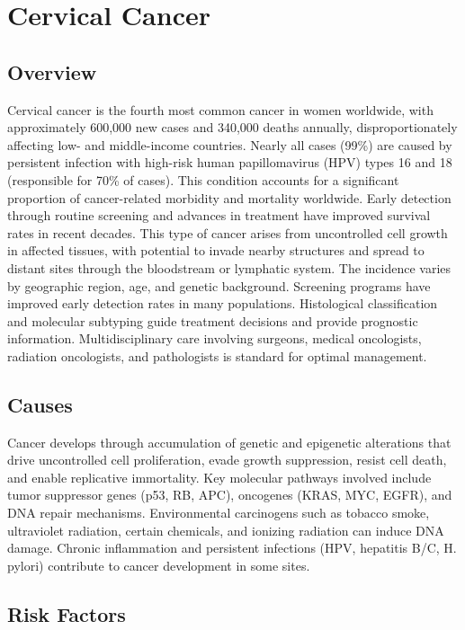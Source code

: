 \chapter{Cervical Cancer}
\label{sec:Cervical Cancer}

\section{Overview}
Cervical cancer is the fourth most common cancer in women worldwide, with approximately 600,000 new cases and 340,000 deaths annually, disproportionately affecting low- and middle-income countries. Nearly all cases (99\%) are caused by persistent infection with high-risk human papillomavirus (HPV) types 16 and 18 (responsible for 70\% of cases). This condition accounts for a significant proportion of cancer-related morbidity and mortality worldwide. Early detection through routine screening and advances in treatment have improved survival rates in recent decades. This type of cancer arises from uncontrolled cell growth in affected tissues, with potential to invade nearby structures and spread to distant sites through the bloodstream or lymphatic system. The incidence varies by geographic region, age, and genetic background. Screening programs have improved early detection rates in many populations. Histological classification and molecular subtyping guide treatment decisions and provide prognostic information. Multidisciplinary care involving surgeons, medical oncologists, radiation oncologists, and pathologists is standard for optimal management.
\section{Causes}
Cancer develops through accumulation of genetic and epigenetic alterations that drive uncontrolled cell proliferation, evade growth suppression, resist cell death, and enable replicative immortality. Key molecular pathways involved include tumor suppressor genes (p53, RB, APC), oncogenes (KRAS, MYC, EGFR), and DNA repair mechanisms. Environmental carcinogens such as tobacco smoke, ultraviolet radiation, certain chemicals, and ionizing radiation can induce DNA damage. Chronic inflammation and persistent infections (HPV, hepatitis B/C, H. pylori) contribute to cancer development in some sites.
\section{Risk Factors}

